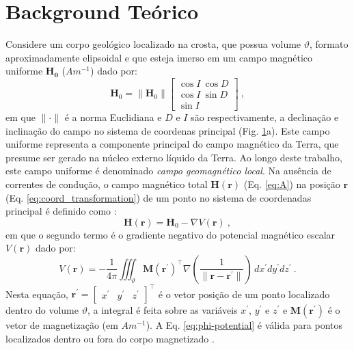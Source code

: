 \begin{figure}[hbt!]
	\label{fig:structural_orientation_angles}
\end{figure}

\section{Background Teórico}

Considere um corpo geológico localizado na crosta, que possua volume $\vartheta$, formato aproximadamente elipsoidal e que esteja imerso em um campo magnético uniforme $\mathbf{{H}_{0}}$ ($\unit{Am^{-1}}$) dado por:
\begin{equation}
\mathbf{H}_{0} = \| \mathbf{H}_{0} \| \left[
\begin{array}{c}
\cos I \: \cos D \\
\cos I \: \sin D \\
\sin I
\end{array}
\right] \: ,
\label{eq:H0}
\end{equation}
em que $\| \cdot \|$ é a norma Euclidiana e $D$ e $I$ são respectivamente, a declinação e inclinação do campo no sistema de coordenas principal (Fig. \ref{fig:structural_orientation_angles}a). Este campo uniforme representa a componente principal do campo magnético da Terra, que presume ser gerado na núcleo externo líquido da Terra. Ao longo deste trabalho, este campo uniforme é denominado \textit{campo geomagnético local}. Na ausência de correntes de condução, o campo magnético total $\mathbf{H}(\mathbf{r})$ (Eq. \ref{eq:A}) na posição $\mathbf{r}$ (Eq. \ref{eq:coord_transformation}) de um ponto no sistema de coordenadas principal é definido como \citep{sharma1966, eskola1980, reitz1992, sttraton2007}:
\begin{equation}
\mathbf{H}(\mathbf{r}) = \mathbf{H}_{0} - \nabla V(\mathbf{r}) \: ,
\label{eq:H}
\end{equation}
em que o segundo termo é o gradiente negativo do potencial magnético escalar $V(\mathbf{r})$ dado por:
\begin{equation}
V(\mathbf{r}) = -\frac{1}{4\pi} \iiint_{\vartheta} 
\mathbf{M}(\mathbf{r}^{\prime})^{\top} 
\nabla \left(
\frac{1}{\| \mathbf{r} - \mathbf{r}^{\prime} \|}
\right) \, dx^{\prime}dy^{\prime}dz^{\prime} \: .
\label{eq:phi-potential}
\end{equation}
Nesta equação, $\mathbf{r}^{\prime} = [\begin{array}{ccc} 
x^{\prime} & y^{\prime} & z^{\prime} \end{array} ]^{\top}$
é o vetor posição de um ponto localizado dentro do volume $\vartheta$, 
a integral é feita sobre as variáveis $x^{\prime}$, $y^{\prime}$ e 
$z^{\prime}$ e 
$\mathbf{M}(\mathbf{r}^{\prime})$ é o vetor de magnetização
(em $\unit{Am^{-1}}$).
A Eq. \ref{eq:phi-potential} é válida para pontos localizados dentro ou fora do corpo magnetizado \citep{dubois1896,sttraton2007, reitz1992}.

